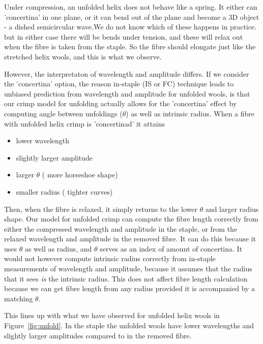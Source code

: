 \documentclass[titlepage,10pt]{article}  %
\begin{document}
Under compression, an unfolded helix does not behave like a spring. It either can 'concertina' in one plane, or it can bend out of the plane and become a 3D object - a dished semicircular wave.We do not know which of these happens in practice. but in either case there will be bends under tension, and these will relax out when the fibre is taken from the staple. So the fibre should elongate just like the stretched helix wools, and this is what we observe.

However, the interpretaton of wavelength and amplitude differs. If we consider the 'concertina' option, the reason in-staple (IS or FC) technique leads to unbiased prediction from wavelength and amplitude for unfolded wools, is that our crimp model for unfolding actually allows for the 'concertina' effect by computing angle between unfoldings ($\theta$) as well as intrinsic radius. When a fibre with unfolded helix crimp is 'concertinad' it attains
\begin{itemize}
\item lower wavelength
\item slightly larger amplitude
\item larger $\theta$ ( more horseshoe shape)
\item smaller radius ( tighter curves)
\end{itemize}
Then, when the fibre is relaxed, it simply returns to the lower $\theta$ and larger radius shape. Our model for unfolded crimp can compute  the fibre length correctly from either the compressed wavelength and amplitude in the staple, or from the relaxed wavelength and amplitude in the removed fibre. It can do this because it uses $\theta$ as well as radius, and $\theta$ serves as an index of amount of concertina. It would not however compute intrinsic radius correctly from in-staple measurements of wavelength and amplitude, because it assumes that the radius that it sees {\em is} the intrinsic radius. This does not affect fibre length calculation because we can get fibre length from any radius provided it is accompanied by a matching $\theta$.

This lines up with what we have observed for unfolded helix wools in Figure~\ref{fig:unfold}. In the staple the unfolded wools have lower wavelengths and slightly larger amplitudes compared to in the removed fibre.
\end{document}
